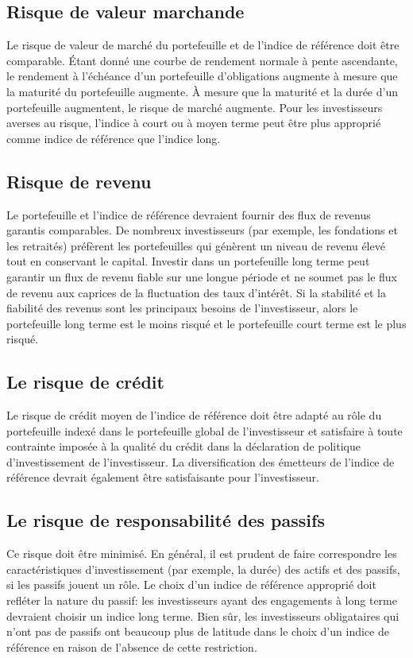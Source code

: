 \documentclass[12pt]{article}
\begin{document}
\subsection{Risque de valeur marchande}
Le risque de valeur de marché du portefeuille et de l'indice de référence doit être comparable. Étant donné une courbe de rendement normale à pente ascendante, le rendement à l'échéance d'un portefeuille d'obligations augmente à mesure que la maturité du portefeuille augmente. À mesure que la maturité et la durée d'un portefeuille augmentent, le risque de marché augmente. Pour les investisseurs averses au risque, l'indice à court ou à moyen terme peut être plus approprié comme indice de référence que l'indice long.
\subsection{Risque de revenu}
Le portefeuille et l'indice de référence devraient fournir des flux de revenus garantis comparables. De nombreux investisseurs (par exemple, les fondations et les retraités) préfèrent les portefeuilles qui génèrent un niveau de revenu élevé tout en conservant le capital. Investir dans un portefeuille long terme peut garantir un flux de revenu fiable sur une longue période et ne soumet pas le flux de revenu aux caprices de la fluctuation des taux d'intérêt. Si la stabilité et la fiabilité des revenus sont les principaux besoins de l'investisseur, alors le portefeuille long terme est le moins risqué et le portefeuille court terme est le plus risqué.
\subsection{Le risque de crédit}
Le risque de crédit moyen de l’indice de référence doit être adapté au rôle du portefeuille indexé dans le portefeuille global de l’investisseur et satisfaire à toute contrainte imposée à la qualité du crédit dans la déclaration de politique d’investissement de l’investisseur. La diversification des émetteurs de l'indice de référence devrait également être satisfaisante pour l'investisseur.
\subsection{Le risque de responsabilité des passifs}
Ce risque doit être minimisé.  En général, il est prudent de faire correspondre les caractéristiques d'investissement (par exemple, la durée) des actifs et des passifs, si les passifs jouent un rôle. Le choix d'un indice de référence approprié doit refléter la nature du passif: les investisseurs ayant des engagements à long terme devraient choisir un indice long terme.  Bien sûr, les investisseurs obligataires qui n'ont pas de passifs ont beaucoup plus de latitude dans le choix d'un indice de référence en raison de l'absence de cette restriction.
\end{document}
